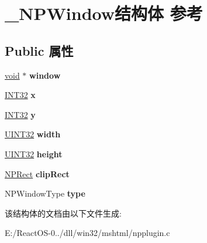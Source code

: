 \hypertarget{struct___n_p_window}{}\section{\+\_\+\+N\+P\+Window结构体 参考}
\label{struct___n_p_window}
\subsection*{Public 属性}
\begin{DoxyCompactItemize}
\item 
\mbox{\label{struct___n_p_window_aba7452f14f927e3261ad97861838b494}} 
\hyperlink{interfacevoid}{void} $\ast$ {\bfseries window}
\item 
\mbox{\label{struct___n_p_window_afd072cc8f8c0d8c0025ce28d3c387707}} 
\hyperlink{_processor_bind_8h_a1137216524060afd426c34677fed058b}{I\+N\+T32} {\bfseries x}
\item 
\mbox{\label{struct___n_p_window_a76141b2b70c3699c506be7e4b2eb232a}} 
\hyperlink{_processor_bind_8h_a1137216524060afd426c34677fed058b}{I\+N\+T32} {\bfseries y}
\item 
\mbox{\label{struct___n_p_window_aa1f6c3e13f554b6212a37ef6cf197036}} 
\hyperlink{_processor_bind_8h_ae1e6edbbc26d6fbc71a90190d0266018}{U\+I\+N\+T32} {\bfseries width}
\item 
\mbox{\label{struct___n_p_window_a4b73bb2b337dadec5ec8907c9bbe5f77}} 
\hyperlink{_processor_bind_8h_ae1e6edbbc26d6fbc71a90190d0266018}{U\+I\+N\+T32} {\bfseries height}
\item 
\mbox{\label{struct___n_p_window_ab14c9414e8c203c36724868ef4a6fe4b}} 
\hyperlink{struct___n_p_rect}{N\+P\+Rect} {\bfseries clip\+Rect}
\item 
\mbox{\label{struct___n_p_window_a56b609c5f878624bae8fa3840cff0ea4}} 
N\+P\+Window\+Type {\bfseries type}
\end{DoxyCompactItemize}


该结构体的文档由以下文件生成\+:\begin{DoxyCompactItemize}
\item 
E\+:/\+React\+O\+S-\/0../dll/win32/mshtml/npplugin.\+c\end{DoxyCompactItemize}
